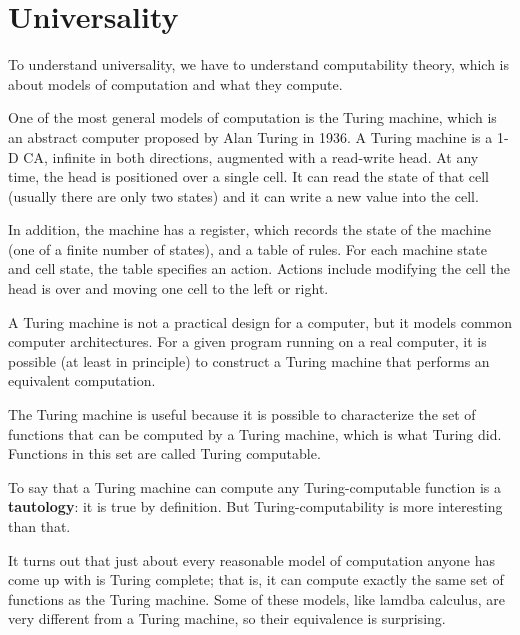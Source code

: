 \documentclass[12pt]{book}
\theoremstyle{exercise}
\begin{document}
\section{Universality}

To understand universality, we have to understand computability
theory, which is about models of computation and what they compute.


One of the most general models of computation is the Turing machine,
which is an abstract computer proposed by Alan Turing in 1936.  A
Turing machine is a 1-D CA, infinite in both directions, augmented
with a read-write head.  At any time, the head is positioned over a
single cell.  It can read the state of that cell (usually there are
only two states) and it can write a new value into the cell.


In addition, the machine has a register, which records the state
of the machine (one of a finite number of states), and a table
of rules.  For each machine state and cell state, the table
specifies an action.  Actions include modifying the cell
the head is over and moving one cell to the left or right.

A Turing machine is not a practical design for a computer, but it
models common computer architectures.  For a given program running on
a real computer, it is possible (at least in principle) to construct a
Turing machine that performs an equivalent computation.

The Turing machine is useful because it is possible to characterize
the set of functions that can be computed by a Turing machine,
which is what Turing did.  Functions in this set are
called Turing computable.


To say that a Turing machine can compute any Turing-computable
function is a {\bf tautology}: it is true by definition.  But
Turing-computability is more interesting than that.


It turns out that just about every reasonable model of computation
anyone has come up with is Turing complete; that is, it can compute
exactly the same set of functions as the Turing machine.
Some of these models, like lamdba calculus, are very different
from a Turing machine, so their equivalence is surprising.
\end{document}

